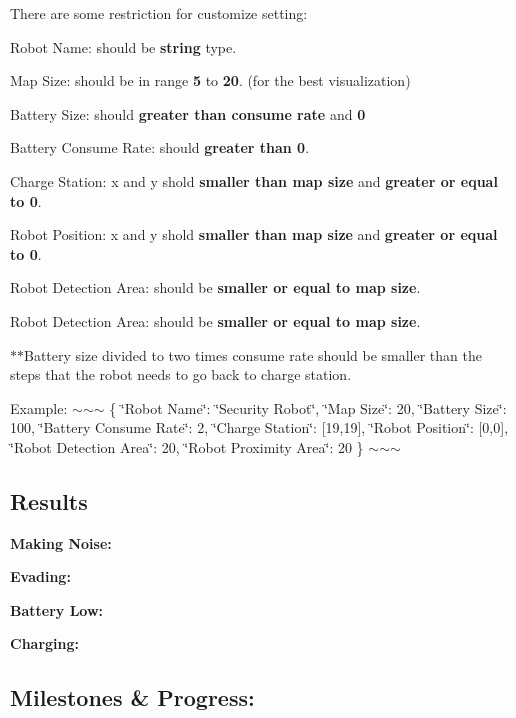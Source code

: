 There are some restriction for customize setting\+:
\begin{DoxyItemize}
\item Robot Name\+: should be {\bfseries string} type.
\item Map Size\+: should be in range {\bfseries 5} to {\bfseries 20}. (for the best visualization)
\item Battery Size\+: should {\bfseries greater than consume rate} and {\bfseries 0}
\item Battery Consume Rate\+: should {\bfseries greater than 0}.
\item Charge Station\+: x and y shold {\bfseries smaller than map size} and {\bfseries greater or equal to 0}.
\item Robot Position\+: x and y shold {\bfseries smaller than map size} and {\bfseries greater or equal to 0}.
\item Robot Detection Area\+: should be {\bfseries smaller or equal to map size}.
\item Robot Detection Area\+: should be {\bfseries smaller or equal to map size}.
\end{DoxyItemize}

$\ast$$\ast$\+Battery size divided to two times consume rate should be smaller than the steps that the robot needs to go back to charge station.

Example\+: $\sim$$\sim$$\sim$ \{ \char`\"{}\+Robot Name\char`\"{}\+: \char`\"{}\+Security Robot\char`\"{}, \char`\"{}\+Map Size\char`\"{}\+: 20, \char`\"{}\+Battery Size\char`\"{}\+: 100, \char`\"{}\+Battery Consume Rate\char`\"{}\+: 2, \char`\"{}\+Charge Station\char`\"{}\+: \mbox{[}19,19\mbox{]}, \char`\"{}\+Robot Position\char`\"{}\+: \mbox{[}0,0\mbox{]}, \char`\"{}\+Robot Detection Area\char`\"{}\+: 20, \char`\"{}\+Robot Proximity Area\char`\"{}\+: 20 \} $\sim$$\sim$$\sim$

\subsection*{Results }

{\bfseries Making Noise\+:}



{\bfseries Evading\+:}



{\bfseries Battery Low\+:}



{\bfseries Charging\+:}



\subsection*{Milestones \& Progress\+: }


